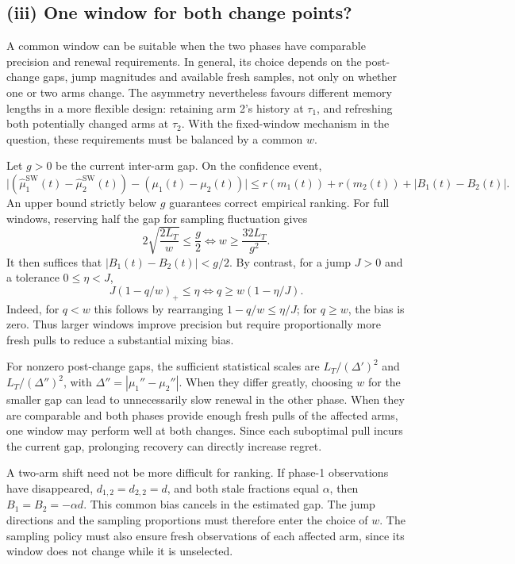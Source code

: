 \subsection*{(iii) One window for both change points?}

A common window can be suitable when the two phases have comparable precision and renewal requirements. In general, its choice depends on the post-change gaps, jump magnitudes and available fresh samples, not only on whether one or two arms change. The asymmetry nevertheless favours different memory lengths in a more flexible design: retaining arm 2's history at $\tau_1$, and refreshing both potentially changed arms at $\tau_2$. With the fixed-window mechanism in the question, these requirements must be balanced by a common $w$.

Let $g>0$ be the current inter-arm gap. On the confidence event,
\[
\bigl|(\widehat\mu_1^{\mathrm{SW}}(t)-\widehat\mu_2^{\mathrm{SW}}(t))-(\mu_1(t)-\mu_2(t))\bigr|\le r(m_1(t))+r(m_2(t))+|B_1(t)-B_2(t)|.
\]
An upper bound strictly below $g$ guarantees correct empirical ranking. For full windows, reserving half the gap for sampling fluctuation gives
\begin{equation}\label{eq:wprec}
2\sqrt{\frac{2L_T}{w}}\le\frac g2\iff w\ge\frac{32L_T}{g^2}.
\end{equation}
It then suffices that $|B_1(t)-B_2(t)|<g/2$. By contrast, for a jump $J>0$ and a tolerance $0\le\eta<J$,
\begin{equation}\label{eq:renewal}
J(1-q/w)_+\le\eta\iff q\ge w(1-\eta/J).
\end{equation}
Indeed, for $q<w$ this follows by rearranging $1-q/w\le\eta/J$; for $q\ge w$, the bias is zero. Thus larger windows improve precision but require proportionally more fresh pulls to reduce a substantial mixing bias.

For nonzero post-change gaps, the sufficient statistical scales are $L_T/(\Delta')^2$ and $L_T/(\Delta'')^2$, with $\Delta''=|\mu_1''-\mu_2''|$. When they differ greatly, choosing $w$ for the smaller gap can lead to unnecessarily slow renewal in the other phase. When they are comparable and both phases provide enough fresh pulls of the affected arms, one window may perform well at both changes. Since each suboptimal pull incurs the current gap, prolonging recovery can directly increase regret.

A two-arm shift need not be more difficult for ranking. If phase-1 observations have disappeared, $d_{1,2}=d_{2,2}=d$, and both stale fractions equal $\alpha$, then $B_1=B_2=-\alpha d$. This common bias cancels in the estimated gap. The jump directions and the sampling proportions must therefore enter the choice of $w$. The sampling policy must also ensure fresh observations of each affected arm, since its window does not change while it is unselected.

